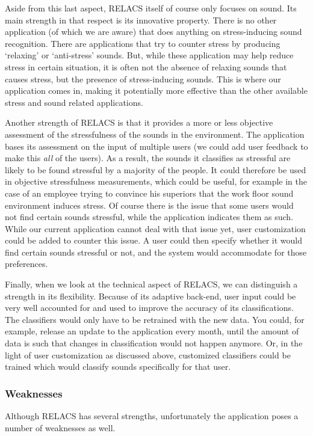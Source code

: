 \documentclass[a4paper]{article}
\begin{document}
Aside from this last aspect, RELACS itself of course only focuses on sound.
Its main strength in that respect is its innovative property.
There is no other application (of which we are aware) that does anything on stress-inducing sound recognition.
There are applications that try to counter stress by producing `relaxing' or `anti-stress' sounds.
But, while these application may help reduce stress in certain situation, it is often not the absence of relaxing sounds that causes stress, but the presence of stress-inducing sounds.
This is where our application comes in, making it potentially more effective than the other available stress and sound related applications.

Another strength of RELACS is that it provides a more or less objective assessment of the stressfulness of the sounds in the environment.
The application bases its assessment on the input of multiple users (we could add user feedback to make this \textit{all} of the users).
As a result, the sounds it classifies as stressful are likely to be found stressful by a majority of the people.
It could therefore be used in objective stressfulness measurements, which could be useful,
for example in the case of an employee trying to convince his superiors that the work floor sound environment induces stress.
Of course there is the issue that some users would not find certain sounds stressful, while the application indicates them as such.
While our current application cannot deal with that issue yet, user customization could be added to counter this issue.
A user could then specify whether it would find certain sounds stressful or not, and the system would accommodate for those preferences.

Finally, when we look at the technical aspect of RELACS, we can distinguish a strength in its flexibility.
Because of its adaptive back-end, user input could be very well accounted for and used to improve the accuracy of its classifications.
The classifiers would only have to be retrained with the new data.
You could, for example, release an update to the application every month, until the amount of data is such that changes in classification would not happen anymore.
Or, in the light of user customization as discussed above, customized classifiers could be trained which would classify sounds specifically for that user.

\subsubsection{Weaknesses}
Although RELACS has several strengths, unfortunately the application poses a number of weaknesses as well.
\end{document}
